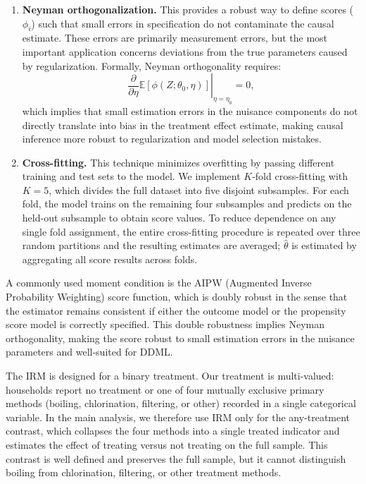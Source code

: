 \documentclass [11pt]{article}
\theoremstyle{plain}
\theoremstyle{definition}
\theoremstyle{remark}
\newcommand{\1}{\bm{1}}
\newcommand{\E}{\mathbb{E}}
\begin{document}
\begin{enumerate}
\item \textbf{Neyman orthogonalization.} This provides a robust way to define scores ($\phi_i$) such that small errors in specification do not contaminate the causal estimate. These errors are primarily measurement errors, but the most important application concerns deviations from the true parameters caused by regularization. Formally, Neyman orthogonality requires:
\begin{equation}
\left. \frac{\partial}{\partial \eta} \E[\phi(Z; \theta_0, \eta)] \right|_{\eta = \eta_0} = 0,
\end{equation}
which implies that small estimation errors in the nuisance components do not directly translate into bias in the treatment effect estimate, making causal inference more robust to regularization and model selection mistakes.

\item \textbf{Cross-fitting.} This technique minimizes overfitting by passing different training and test sets to the model. We implement $K$-fold cross-fitting with $K=5$, which divides the full dataset into five disjoint subsamples. For each fold, the model trains on the remaining four subsamples and predicts on the held-out subsample to obtain score values. To reduce dependence on any single fold assignment, the entire cross-fitting procedure is repeated over three random partitions and the resulting estimates are averaged; $\hat{\theta}$ is estimated by aggregating all score results across folds.
\end{enumerate}

A commonly used moment condition is the AIPW (Augmented Inverse Probability Weighting) score function, which is doubly robust in the sense that the estimator remains consistent if either the outcome model or the propensity score model is correctly specified. This double robustness implies Neyman orthogonality, making the score robust to small estimation errors in the nuisance parameters and well-suited for DDML.

The IRM is designed for a binary treatment. Our treatment is multi-valued: households report no treatment or one of four mutually exclusive primary methods (boiling, chlorination, filtering, or other) recorded in a single categorical variable. In the main analysis, we therefore use IRM only for the any-treatment contrast, which collapses the four methods into a single treated indicator and estimates the effect of treating versus not treating on the full sample. This contrast is well defined and preserves the full sample, but it cannot distinguish boiling from chlorination, filtering, or other treatment methods.
\end{document}

